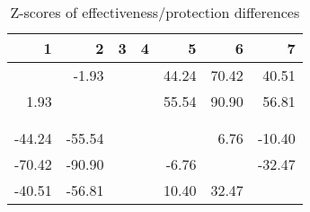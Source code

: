 \begin{table}[ht]
\centering
\begin{tabular}{rrrrrrr}
  \hline
1 & 2 & 3 & 4 & 5 & 6 & 7 \\ 
  \hline
 & -1.93 &  &  & 44.24 & 70.42 & 40.51 \\ 
  1.93 &  &  &  & 55.54 & 90.90 & 56.81 \\ 
   &  &  &  &  &  &  \\ 
   &  &  &  &  &  &  \\ 
  -44.24 & -55.54 &  &  &  & 6.76 & -10.40 \\ 
  -70.42 & -90.90 &  &  & -6.76 &  & -32.47 \\ 
  -40.51 & -56.81 &  &  & 10.40 & 32.47 &  \\ 
   \hline
\end{tabular}
\caption{Z-scores of effectiveness/protection differences} 
\end{table}
